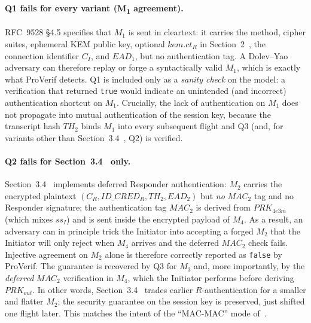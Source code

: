 \documentclass{easychair}
\newcommand{\VarSec}[1]{Section~#1~\cite{pq-edhoc-draft}}
\begin{document}
\paragraph{Q1 fails for every variant (M\textsubscript{1} agreement).}
RFC~9528 \S4.5 specifies that $M_1$ is sent in cleartext: it carries
the method, cipher suites, ephemeral KEM public key, optional
$\mathit{kem.ct}_R$ in \VarSec{2}, the connection identifier $C_I$, and
$\mathit{EAD}_1$, but no authentication tag. A Dolev--Yao adversary can
therefore replay or forge a syntactically valid $M_1$, which is exactly
what ProVerif detects. Q1 is included only as a \emph{sanity check} on
the model: a verification that returned \texttt{true} would indicate an
unintended (and incorrect) authentication shortcut on $M_1$. Crucially,
the lack of authentication on $M_1$ does not propagate into mutual
authentication of the session key, because the transcript hash $TH_2$
binds $M_1$ into every subsequent flight and Q3 (and, for variants
other than \VarSec{3.4}, Q2) is verified.

\paragraph{Q2 fails for \texorpdfstring{\VarSec{3.4}}{Section 3.4} only.}
\VarSec{3.4} implements deferred Responder authentication: $M_2$
carries the encrypted plaintext $(C_R, ID\_CRED_R, TH_2, EAD_2)$ but
\emph{no} $\mathit{MAC}_2$ tag and no Responder signature; the
authentication tag $\mathit{MAC}_2$ is derived from
$\mathit{PRK}_{4e3m}$ (which mixes $\mathit{ss}_I$) and is sent inside
the encrypted payload of $M_4$. As a result, an adversary can in
principle trick the Initiator into accepting a forged $M_2$ that the
Initiator will only reject when $M_4$ arrives and the deferred
$\mathit{MAC}_2$ check fails. Injective agreement on $M_2$ alone is
therefore correctly reported as \texttt{false} by ProVerif. The
guarantee is recovered by Q3 for $M_3$ and, more importantly, by the
\emph{deferred} $\mathit{MAC}_2$ verification in $M_4$, which the
Initiator performs before deriving $\mathit{PRK}_{out}$. In other
words, \VarSec{3.4} trades earlier $R$-authentication for a smaller
and flatter $M_2$; the security guarantee on the session key is
preserved, just shifted one flight later. This matches the intent of
the ``MAC-MAC'' mode of~\cite{pq-edhoc-draft}.
\end{document}
